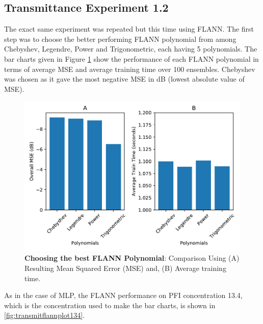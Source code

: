 \documentclass[]{article}
\begin{document}
\newpage

\hypertarget{transmittance-experiment-1.2}{%
\subsection{Transmittance Experiment 1.2}\label{transmittance-experiment-1.2}}

The exact same experiment was repeated but this time using FLANN. The first step was to choose the better performing FLANN polynomial from among Chebyshev, Legendre, Power and Trigonometric, each having 5 polynomials. The bar charts given in Figure \ref{fig:transflannbar} show the performance of each FLANN polynomial in terms of average MSE and average training time over 100 ensembles. Chebyshev was chosen as it gave the most negative MSE in dB (lowest absolute value of MSE).

\begin{figure}
\centering
\includegraphics{Report_files/figure-latex/transflannbar-1.pdf}
\caption{\label{fig:transflannbar}\textbf{Choosing the best FLANN Polynomial}: Comparison Using (A) Resulting Mean Squared Error (MSE) and, (B) Average training time.}
\end{figure}

As in the case of MLP, the FLANN performance on PFI concentration 13.4, which is the concentration used to make the bar charts, is shown in \ref{fig:transmitflannplot134}.
\end{document}
